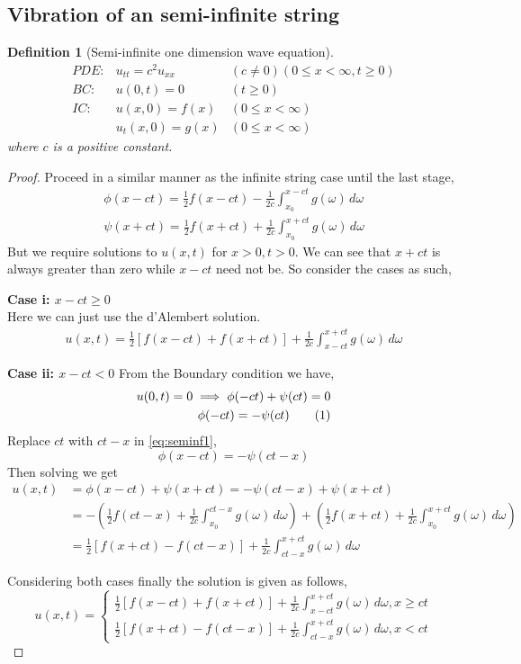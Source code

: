 \documentclass[oneside,11pt,pdftex,final]{book}%
\numberwithin{equation}{section}
\newcommand\numberthis{\addtocounter{equation}{1}\tag{\theequation}}
\newtheorem{definition}[theorem]{Definition}
\numberwithin{section}{chapter}
\numberwithin{equation}{chapter}
\begin{document}
\subsection{Vibration of an semi-infinite string}
\begin{definition}[Semi-infinite one dimension wave equation]
	\begin{align*}
		PDE:& u_{tt}=c^2u_{xx} & (c\neq0)(0\leq x < \infty, t\geq 0)\\
		BC:& u(0,t)=0 &  (t \geq 0)\\
		IC:& u(x,0)=f(x) &(0\leq x <\infty)\\
		& u_t(x,0)=g(x) &(0\leq x <\infty) 
	\end{align*}
where $ c $ is a positive constant.
\end{definition}
\begin{proof}
	Proceed in a similar manner as the infinite string case until the last stage,
	\begin{align*}
		\phi(x-ct)=\frac{1}{2}f(x-ct)-\frac{1}{2c}\int_{x_0}^{x-ct} g(\omega)\, d\omega \\
		\psi(x+ct)=\frac{1}{2}f(x+ct)+\frac{1}{2c}\int_{x_0}^{x+ct} g(\omega)\, d\omega
	\end{align*}
	But we require solutions to $ u(x,t) $ for $ x>0, t>0 $. We can see that $ x+ct $ is always greater than zero while $ x-ct $ need not be. So consider the cases as such,
	
	\textbf{Case i: $ x-ct\geq0 $}\\
	Here we can just use the 	d'Alembert solution.
	\begin{align}
		u(x,t)=\frac{1}{2}[f(x-ct)+f(x+ct)]+\frac{1}{2c}\int_{x-ct}^{x+ct} g(\omega) \, d \omega 
	\end{align}

	\textbf{Case ii: $x-ct<0$}
	From the Boundary condition we have,
	\begin{align*}
		u(0,t)=0\implies \phi(-ct)+\psi(ct)=0\\
		\phi(-ct)=-\psi(ct)\numberthis \label{eq:seminf1}
	\end{align*}
	Replace $ ct $ with $ ct-x $ in \ref{eq:seminf1},
	\[ \phi(x-ct)=-\psi(ct-x) \]
	Then solving we get 
	\begin{align*}
		 u(x,t) &=\phi(x-ct)+\psi(x+ct)=-\psi(ct-x)+\psi(x+ct)\\
		 &=-\left(\frac{1}{2}f(ct-x)+\frac{1}{2c}\int_{x_0}^{ct-x}g(\omega)\, d\omega\right)+\left(\frac{1}{2}f(x+ct)+\frac{1}{2c}\int_{x_0}^{x+ct}g(\omega)\, d \omega\right)\\
		 &=\frac{1}{2}\left[f(x+ct)-f(ct-x)\right]+\frac{1}{2c}\int_{ct-x}^{x+ct}g(\omega)\, d \omega
 \end{align*}
	 
	 Considering both cases finally the solution is given as follows,
	 	\[u(x,t)=\begin{cases}
	 	\frac{1}{2}[f(x-ct)+f(x+ct)]+\frac{1}{2c}\int_{x-ct}^{x+ct}g(\omega)\, d\omega, x\geq ct\\
	 	\frac{1}{2}[f(x+ct)-f(ct-x)]+\frac{1}{2c}\int_{ct-x}^{x+ct}g(\omega)\, d\omega, x<ct
	 \end{cases}  \]
 \end{proof}
\end{document}

